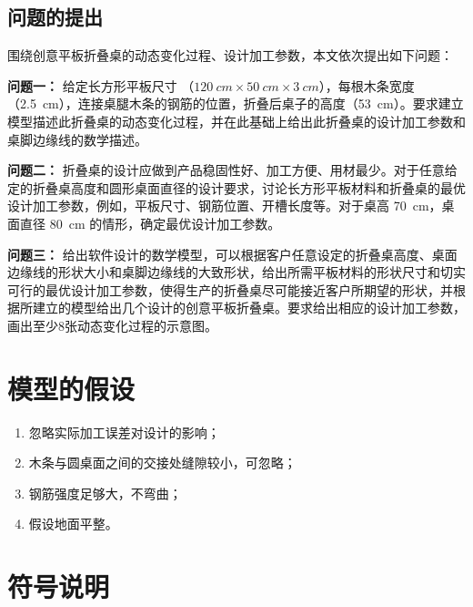 \documentclass[bwprint,fontset=windows]{gmcmthesis}
\begin{document}
\subsection{问题的提出}


\noindent 围绕创意平板折叠桌的动态变化过程、设计加工参数，本文依次提出如下问题：

\textbf{问题一：} 给定长方形平板尺寸 （$\SI{120}{cm} \times \SI{50}{cm} \times \SI{3}{cm}$），每根木条宽度（\SI{2.5}{cm}），连接桌腿木条的钢筋的位置，折叠后桌子的高度（\SI{53}{cm}）。要求建立模型描述此折叠桌的动态变化过程，并在此基础上给出此折叠桌的设计加工参数和桌脚边缘线的数学描述。


\textbf{问题二：} 折叠桌的设计应做到产品稳固性好、加工方便、用材最少。对于任意给定的折叠桌高度和圆形桌面直径的设计要求，讨论长方形平板材料和折叠桌的最优设计加工参数，例如，平板尺寸、钢筋位置、开槽长度等。对于桌高 \SI{70}{cm}，桌面直径 \SI{80}{cm} 的情形，确定最优设计加工参数。


\textbf{问题三：} 给出软件设计的数学模型，可以根据客户任意设定的折叠桌高度、桌面边缘线的形状大小和桌脚边缘线的大致形状，给出所需平板材料的形状尺寸和切实可行的最优设计加工参数，使得生产的折叠桌尽可能接近客户所期望的形状，并根据所建立的模型给出几个设计的创意平板折叠桌。要求给出相应的设计加工参数，画出至少8张动态变化过程的示意图。



\clearpage
\section{模型的假设}

\begin{enumerate}
\item 忽略实际加工误差对设计的影响；
\item 木条与圆桌面之间的交接处缝隙较小，可忽略；
\item 钢筋强度足够大，不弯曲；
\item 假设地面平整。
\end{enumerate}


\section{符号说明}
\end{document}
